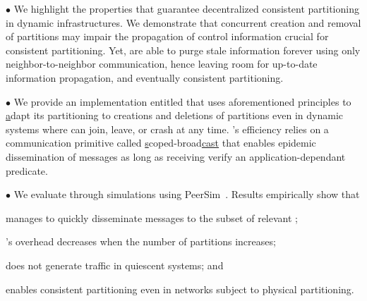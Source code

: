 \begin{asparadesc} %
\item [$\bullet$] We highlight the properties that guarantee
  decentralized consistent partitioning in dynamic infrastructures. We
  demonstrate that concurrent creation and removal of partitions may
  impair the propagation of control information crucial for consistent
  partitioning. Yet, \processes are able to purge stale information
  forever using only neighbor-to-neighbor communication, hence leaving
  room for up-to-date information propagation, and eventually
  consistent partitioning.
  
\item [$\bullet$] We provide an implementation entitled \NAME that
  uses aforementioned principles to \underline{a}dapt its partitioning
  to creations and deletions of partitions even in dynamic systems
  where \nodes can join, leave, or crash at any time. \NAME's
  efficiency relies on a communication primitive called
  \underline{s}coped-broad\underline{cast}
   that enables epidemic
  dissemination of messages as long as receiving \processes verify an
  application-dependant predicate.
 
\item [$\bullet$] We evaluate \NAME through simulations using
  PeerSim~\cite{montresor2009peersim}. Results empirically show that
  \begin{inparaenum}[(i)]
  \item \NAME manages to quickly disseminate messages to the subset of
    relevant \processes;
  \item \NAME's overhead decreases when the number of partitions
    increases;
  \item \NAME does not generate traffic in quiescent systems; and
  \item \NAME enables consistent partitioning even in networks subject
    to physical partitioning.
  \end{inparaenum}
\end{asparadesc}



